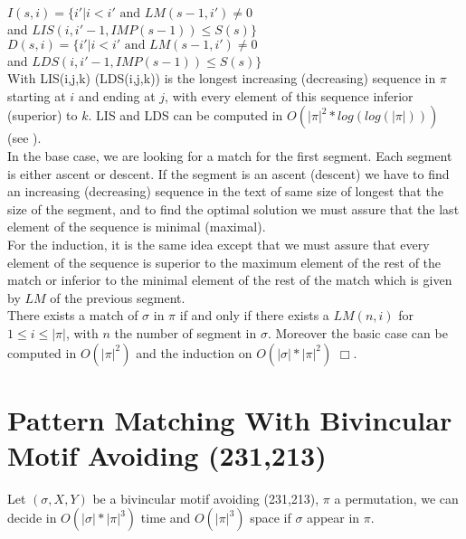 \documentclass[a4paper]{llncs}
\newcommand{\ptext}{\pi}
\newcommand{\pmotif}{\sigma}
\newcommand{\x}{X}
\newcommand{\y}{Y}
\newcommand{\bmotif}{(\sigma,\x,\y)}
\newcounter{num}
\begin{document}
			$I(s,i)=\{i'|\text{$i<i'$ and $LM(s-1,i')\neq 0$}$ \\
			\indent \indent \indent and  $LIS(i,i'-1,IMP(s-1)) \leq S(s) \}$ \\
			
			$D(s,i)=\{i'|\text{$i<i'$ and $LM(s-1,i')\neq 0$}$ \\
			\indent \indent \indent and  $LDS(i,i'-1,IMP(s-1)) \leq S(s) \}$ \\
					                       
			With LIS(i,j,k) (LDS(i,j,k)) is the longest increasing (decreasing) sequence in $\ptext$ starting at $i$ and ending at $j$,
			with every element of this sequence
			inferior (superior) to $k$. 
			LIS and LDS can be computed in $O(|\ptext|^2*log(log(|\ptext|)))$ (see \cite{Bespamyatnikh00enumeratinglongest}).\\
			
			In the base case, 
			we are looking for a match for the first segment.
			Each segment is either ascent or descent.
			If the segment is an ascent (descent)
			we have to find an increasing (decreasing) sequence
			in the text of same size of longest that 
			the size of the segment,
			and to find the optimal solution 
			we must assure that the last element
			of the sequence is minimal (maximal).\\
			For the induction, it is the same idea
			except that we must assure that 
			every element of the sequence is superior 
			to the maximum element of the rest of the match
			or inferior to the minimal element of the rest of the match
			which is given by $LM$ of
			the previous segment.\\
			
			There exists a match of $\pmotif$ in $\ptext$ if and only if
			there exists a $LM(n,i)$ for $1 \leq i \leq |\ptext|$,
			with $n$ the number of segment in $\pmotif$.
			Moreover the basic case can be computed in $O(|\ptext|^2)$
			and the induction on $O(|\pmotif|*|\ptext|^2)$ $\Box$.
			
					
		\section{Pattern Matching With Bivincular Motif Avoiding (231,213)}	
		
			\begin{proposition}
			Let $\bmotif$ be a bivincular motif 
			avoiding (231,213), 
			$\ptext$ a permutation,
			we can decide in $O(|\pmotif|*|\ptext|^3)$ time
			and $O(|\ptext|^3)$ space
			if $\pmotif$ 
			appear in $\ptext$.
			\end{proposition}
					
\end{document}
